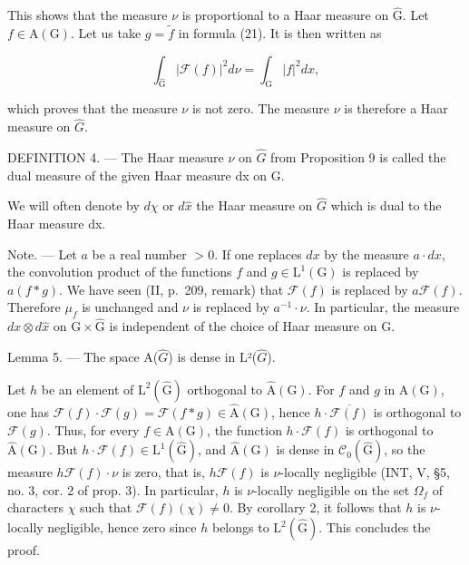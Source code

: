 This shows that the measure \(\nu\) is proportional to a Haar measure on \(\widehat{\mathrm{G}}\). Let \(f \in \mathrm{A}(\mathrm{G})\). Let us take \(g = \widetilde{f}\) in formula (21). It is then written as

\[
\int_ {\widehat {\mathrm{G}}} | \mathcal {F} (f) | ^ {2} d \nu = \int_ {\mathrm{G}} | f | ^ {2} d x,\tag{22}
\]

which proves that the measure \(\nu\) is not zero. The measure \(\nu\) is therefore a Haar measure on \(\widehat{G}\).

DEFINITION 4. --- The Haar measure \(\nu\) on \(\widehat{G}\) from Proposition 9 is called the dual measure of the given Haar measure dx on G.

We will often denote by \(d\chi\) or \(d\widehat{x}\) the Haar measure on \(\widehat{G}\) which is dual to the Haar measure dx.

Note. --- Let \(a\) be a real number \(>0\). If one replaces \(dx\) by the measure \(a \cdot dx\), the convolution product of the functions \(f\) and \(g \in \mathrm{L}^{1}(\mathrm{G})\) is replaced by \(a(f*g)\). We have seen (II, p.~209, remark) that \(\mathcal{F}(f)\) is replaced by \(a\mathcal{F}(f)\). Therefore \(\mu_{f}\) is unchanged and \(\nu\) is replaced by \(a^{-1} \cdot \nu\). In particular, the measure \(dx \otimes d\hat{x}\) on \(\mathrm{G} \times \hat{\mathrm{G}}\) is independent of the choice of Haar measure on \(\mathrm{G}\).

Lemma 5. --- The space A(\(\hat{G}\)) is dense in L²(\(\hat{G}\)).

Let \(h\) be an element of \(\mathrm{L}^2(\widehat{\mathrm{G}})\) orthogonal to \(\widehat{\mathrm{A}}(\mathrm{G})\). For \(f\) and \(g\) in \(\mathrm{A}(\mathrm{G})\), one has \(\mathcal{F}(f) \cdot \mathcal{F}(g) = \mathcal{F}(f*g) \in \widehat{\mathrm{A}}(\mathrm{G})\), hence \(h \cdot \overline{\mathcal{F}(f)}\) is orthogonal to \(\mathcal{F}(g)\). Thus, for every \(f \in \mathrm{A}(\mathrm{G})\), the function \(h \cdot \mathcal{F}(f)\) is orthogonal to \(\widehat{\mathrm{A}}(\mathrm{G})\). But \(h \cdot \mathcal{F}(f) \in \mathrm{L}^1(\widehat{\mathrm{G}})\), and \(\widehat{\mathrm{A}}(\mathrm{G})\) is dense in \(\mathcal{C}_0(\widehat{\mathrm{G}})\), so the measure \(h\mathcal{F}(f) \cdot \nu\) is zero, that is, \(h\mathcal{F}(f)\) is \(\nu\)-locally negligible (INT, V, §5, no. 3, cor. 2 of prop. 3). In particular, \(h\) is \(\nu\)-locally negligible on the set \(\Omega_f\) of characters \(\chi\) such that \(\mathcal{F}(f)(\chi) \neq 0\). By corollary 2, it follows that \(h\) is \(\nu\)-locally negligible, hence zero since \(h\) belongs to \(\mathrm{L}^2(\widehat{\mathrm{G}})\). This concludes the proof.

